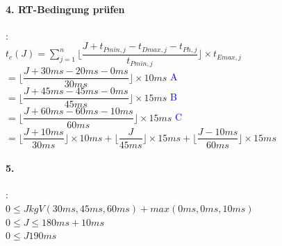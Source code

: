 \documentclass[12pt,a4paper,oneside,ngerman]{article}
\begin{document}
\paragraph{4. RT-Bedingung prüfen}:\\

\(t_{c}(J) = \displaystyle\sum_{j=1}^n \Big\lfloor \dfrac{J + t_{Pmin,j} - t_{Dmax,j} - t_{Ph,j} }{ t_{Pmin,j} } \Big\rfloor \times t_{Emax,j}\) \\
\(= \Big\lfloor \dfrac{J + 30ms - 20ms - 0ms }{ 30ms } \Big\rfloor \times 10ms\) \textcolor{blue}{A} \\
\(= \Big\lfloor \dfrac{J + 45ms - 45ms - 0ms }{ 45ms } \Big\rfloor \times 15ms\) \textcolor{blue}{B} \\
\(= \Big\lfloor \dfrac{J + 60ms - 60ms - 10ms }{ 60ms } \Big\rfloor \times 15ms\) \textcolor{blue}{C} \\
\(= \Big\lfloor \dfrac{J + 10ms }{ 30ms } \Big\rfloor \times 10ms + \Big\lfloor \dfrac{J}{ 45ms } \Big\rfloor \times 15ms + \Big\lfloor \dfrac{J - 10ms }{ 60ms } \Big\rfloor \times 15ms\)\\

\paragraph{5.}:\\

\( 0 \leq J kgV(30ms, 45ms, 60ms) + max(0ms, 0ms, 10ms) \) \\
\( 0 \leq J \leq 180ms + 10ms\)\\
\( 0 \leq J 190ms\)\\
\end{document}
